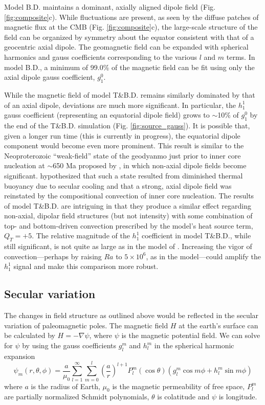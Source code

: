 \documentclass[12pt,letterpaper]{article}
\begin{document}
Model B.D. maintains a dominant, axially aligned dipole field (Fig. \ref{fig:composite}c). While fluctuations are present, as seen by the diffuse patches of magnetic flux at the CMB (Fig. \ref{fig:composite}c), the large-scale structure of the field can be organized by symmetry about the equator consistent with that of a geocentric axial dipole. The geomagnetic field can be expanded with spherical harmonics and gauss coefficients corresponding to the various $l$ and $m$ terms. In model B.D., a minimum of 99.0\% of the magnetic field can be fit using only the axial dipole gauss coefficient, $g^{0}_{1}$. 

While the magnetic field of model T\&B.D. remains similarly dominated by that of an axial dipole, deviations are much more significant. In particular, the $h^{1}_{1}$ gauss coefficient (representing an equatorial dipole field) grows to $\sim$10\% of $g^{0}_{1}$ by the end of the T\&B.D. simulation (Fig. \ref{fig:source_gauss}). It is possible that, given a longer run time (this is currently in progress), the equatorial dipole component would become even more prominent. This result is similar to the Neoproterozoic ``weak-field'' state of the geodyanmo just prior to inner core nucleation at $\sim$650 Ma proposed by \cite{Driscoll2016b}, in which non-axial dipole fields become significant. \cite{Driscoll2016b} hypothesized that such a state resulted from diminished thermal buoyancy due to secular cooling and that a strong, axial dipole field was reinstated by the compositional convection of inner core nucleation. The results of model T\&B.D. are intriguing in that they produce a similar effect regarding non-axial, dipolar field structures (but not intensity) with some combination of top- and bottom-driven convection prescribed by the model's heat source term, $Q_T=+5$. The relative magnitude of the $h^{1}_{1}$ coefficient in model T\&B.D., while still significant, is not quite as large as in the model of \cite{Driscoll2016b}. Increasing the vigor of convection---perhaps by raising $Ra$ to $5\times10^6$, as in the \cite{Driscoll2016b} model---could amplify the $h^{1}_{1}$ signal and make this comparison more robust.

\subsection*{Secular variation}
The changes in field structure as outlined above would be reflected in the secular variation of paleomagnetic poles. The magnetic field $H$ at the earth's surface can be calculated by $H=-\nabla\psi$, where $\psi$ is the magnetic potential field. We can solve for $\psi$ by using the gauss coefficients $g^{m}_{l}$ and $h^{m}_{l}$ in the spherical harmonic expansion
\begin{equation}
\psi_m(r, \theta, \phi)=\frac{a}{\mu_0}\sum_{l=1}^{\infty}\sum_{m=0}^{l}(\frac{a}{r})^{l+1}P_{l}^{m}(\cos{\theta})(g^{m}_{l}\cos{m\phi}+h^{m}_{l}\sin{m\phi})
\end{equation}
where $a$ is the radius of Earth, $\mu_0$ is the magnetic permeability of free space, $P_{l}^{m}$ are partially normalized Schmidt polynomials, $\theta$ is colatitude and $\psi$ is longitude.
\end{document}
